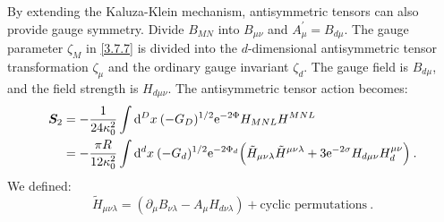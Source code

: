 By extending the Kaluza-Klein mechanism, antisymmetric tensors can also provide gauge symmetry.
Divide $B_{M N}$ into $B_{\mu \nu}$ and $A_{\mu}^{\prime}=B_{d \mu}$. The gauge parameter $\zeta_{M}$ in \eqref{3.7.7} is divided into the $d$-dimensional antisymmetric tensor transformation $\zeta_{\mu}$ and the ordinary gauge invariant $\zeta_{d}$. The gauge field is $B_{d \mu}$, and the field strength is $H_{d \mu \nu}$.
The antisymmetric tensor action becomes:
\begin{align}
	\bm{S}_{2} &=-\frac{1}{24 \kappa_{0}^{2}} \int \mathrm{d}^{D} x \:(-G_{D})^{1 / 2} \mathrm{e}^{-2 \Phi} H_{M N L} H^{M N L} \nonumber \\
	&=-\frac{\pi R}{12 \kappa_{0}^{2}} \int \mathrm{d}^{d} x \: (-G_{d})^{1/2} \mathrm{e}^{-2 \Phi_{d}}
	\Bigl(\tilde{H}_{\mu \nu \lambda} \tilde{H}^{\mu \nu \lambda}+3 \mathrm{e}^{-2 \sigma} H_{d \mu \nu} H_{d}^{\mu \nu}\Bigr) \:. \label{8.1.13}
\end{align}
We defined:
\begin{equation}
	\tilde{H}_{\mu \nu \lambda}=(\partial_{\mu} B_{\nu \lambda}-A_{\mu} H_{d \nu \lambda})+\text{cyclic permutations} \:. \label{8.1.14}
\end{equation}
